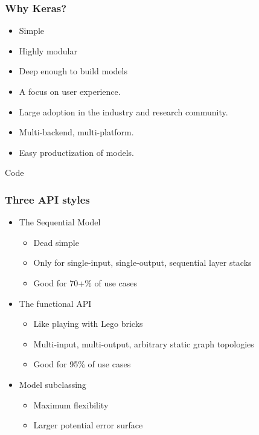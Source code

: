 \begin{frame}[fragile] \frametitle{Why Keras?}

\begin{itemize}
\item  Simple 
\item  Highly modular 
\item  Deep enough to build models
\item  A focus on user experience.
\item  Large adoption in the industry and research community.
\item  Multi-backend, multi-platform.
\item  Easy productization of models.
\end{itemize}
\end{frame}


\begin{frame}
  \begin{center}
    {\Large Code}
    
  \end{center}
\end{frame}

\begin{frame}[fragile] \frametitle{Three API styles}

\begin{itemize}
\item   The Sequential Model
\begin{itemize}
\item   Dead simple
\item   Only for single-input, single-output, sequential layer stacks
\item   Good for 70+\% of use cases
\end{itemize}
\item   The functional API
\begin{itemize}
\item   Like playing with Lego bricks
\item    Multi-input, multi-output, arbitrary static graph topologies
\item   Good for 95\% of use cases
\end{itemize}
\item   Model subclassing
\begin{itemize}
\item    Maximum flexibility
\item    Larger potential error surface
\end{itemize}
\end{itemize}
\end{frame}


